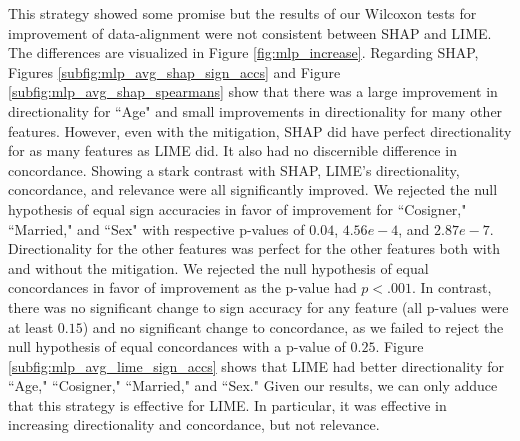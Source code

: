 \documentclass[12pt]{article}  %
\begin{document}
            This strategy showed some promise but the results of our Wilcoxon tests for improvement of data-alignment were not consistent between SHAP and LIME. The differences are visualized in Figure \ref{fig:mlp_increase}. 
             Regarding SHAP, Figures \ref{subfig:mlp_avg_shap_sign_accs} and Figure \ref{subfig:mlp_avg_shap_spearmans} show that there was a large improvement in directionality for ``Age" and small improvements in directionality for many other features. However, even with the mitigation, SHAP did have perfect directionality for as many features as LIME did.  It also had no discernible difference in concordance. 
            Showing a stark contrast with SHAP, LIME's directionality, concordance, and relevance were all significantly improved. We rejected the null hypothesis of equal sign accuracies in favor of improvement for ``Cosigner," ``Married," and ``Sex" with respective p-values of $0.04$, $4.56e-4$, and $2.87e-7$. Directionality for the other features was perfect for the other features both with and without the mitigation. We rejected the null hypothesis of equal concordances in favor of improvement as the p-value had $p<.001$. In contrast, there was no significant change to sign accuracy for any feature (all p-values were at least $0.15$) and no significant change to concordance, as we failed to reject the null hypothesis of equal concordances with a p-value of $0.25$.  Figure \ref{subfig:mlp_avg_lime_sign_accs} shows that LIME  had better directionality for ``Age," ``Cosigner," ``Married," and ``Sex." Given our results, we can only adduce that this strategy is effective for LIME. In particular, it was effective in increasing directionality and concordance, but not relevance.  %
            
            
\end{document}
